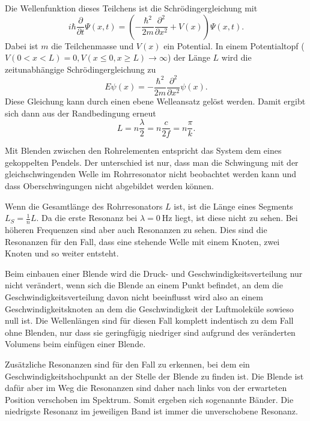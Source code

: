 Die Wellenfunktion dieses Teilchens ist die Schrödingergleichung mit 
\begin{equation*}
    i \hbar \frac{\partial}{\partial t} \Psi(x,t) = \left(- \frac{\hbar^2}{2m} \frac{\partial^2}{\partial x^2} + V(x)\right) \Psi(x,t).
\end{equation*}
Dabei ist $m$ die Teilchenmasse und $V(x)$ ein Potential. 
In einem Potentialtopf ($V(0 < x < L) = 0, V(x \leq 0, x \geq L) \to \infty$) der Länge $L$ wird die zeitunabhängige Schrödingergleichung zu 
\begin{equation*}
    E \psi(x) = - \frac{\hbar^2}{2m} \frac{\partial^2}{\partial x^2} \psi(x).
\end{equation*}
Diese Gleichung kann durch einen ebene Welleansatz gelöst werden. Damit ergibt sich dann aus der Randbedingung erneut
\begin{equation*}
    L = n \frac{\lambda}{2} = n \frac{c}{2f} = n \frac{\pi}{k}.
\end{equation*}

Mit Blenden zwischen den Rohrelementen entspricht das System dem eines gekoppelten Pendels.
Der unterschied ist nur, dass man die Schwingung mit der gleichschwingenden Welle im Rohrresonator nicht beobachtet werden kann und dass Oberschwingungen nicht abgebildet werden können. 


Wenn die Gesamtlänge des Rohrresonators $L$ ist, ist die Länge eines Segments $L_S = \frac{1}{n} L$. 
Da die erste Resonanz bei $\lambda = \SI{0}{\hertz}$ liegt, ist diese nicht zu sehen. Bei höheren Frequenzen sind aber auch Resonanzen zu sehen. Dies sind die Resonanzen für den Fall, dass eine stehende Welle mit einem Knoten, zwei Knoten und so weiter entsteht. 

Beim einbauen einer Blende wird die Druck- und Geschwindigkeitsverteilung nur nicht verändert, wenn sich die Blende an einem Punkt befindet, an dem die Geschwindigkeitsverteilung davon nicht beeinflusst wird also an einem Geschwindigkeitsknoten an dem die Geschwindigkeit der Luftmoleküle sowieso null ist.
Die Wellenlängen sind für diesen Fall komplett indentisch zu dem Fall ohne Blenden, nur dass sie geringfügig niedriger sind aufgrund des veränderten Volumens beim einfügen einer Blende.

Zusätzliche Resonanzen sind für den Fall zu erkennen, bei dem ein Geschwindigkeitshochpunkt an der Stelle der Blende zu finden ist.
Die Blende ist dafür aber im Weg die Resonanzen sind daher nach links von der erwarteten Position verschoben im Spektrum. Somit ergeben sich sogenannte Bänder. Die niedrigste Resonanz im jeweiligen Band ist immer die unverschobene Resonanz.

